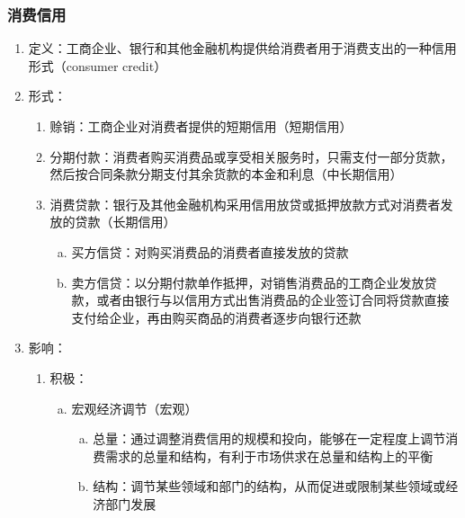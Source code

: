 \documentclass[12pt]{book}
\begin{document}
\subsubsection{消费信用}


\begin{enumerate}[1.]
    \item 定义：工商企业、银行和其他金融机构提供给消费者用于消费支出的一种信用形式（consumer credit）
    \item 形式：
          \begin{enumerate}[(1)]
              \item 赊销：工商企业对消费者提供的短期信用（短期信用）
              \item 分期付款：消费者购买消费品或享受相关服务时，只需支付一部分货款，然后按合同条款分期支付其余货款的本金和利息（中长期信用）
              \item 消费贷款：银行及其他金融机构采用信用放贷或抵押放款方式对消费者发放的贷款（长期信用）
                    \begin{enumerate}[a.]
                        \item 买方信贷：对购买消费品的消费者直接发放的贷款
                        \item 卖方信贷：以分期付款单作抵押，对销售消费品的工商企业发放贷款，或者由银行与以信用方式出售消费品的企业签订合同将贷款直接支付给企业，再由购买商品的消费者逐步向银行还款
                    \end{enumerate}
          \end{enumerate}
    \item 影响：
          \begin{enumerate}[(1)]
              \item 积极：
                    \begin{enumerate}[a.]
                        \item 宏观经济调节（宏观）
                              \begin{enumerate}[(a)]
                                  \item 总量：通过调整消费信用的规模和投向，能够在一定程度上调节消费需求的总量和结构，有利于市场供求在总量和结构上的平衡
                                  \item 结构：调节某些领域和部门的结构，从而促进或限制某些领域或经济部门发展

\end{enumerate}
\end{enumerate}
\end{enumerate}
\end{enumerate}
\end{document}
